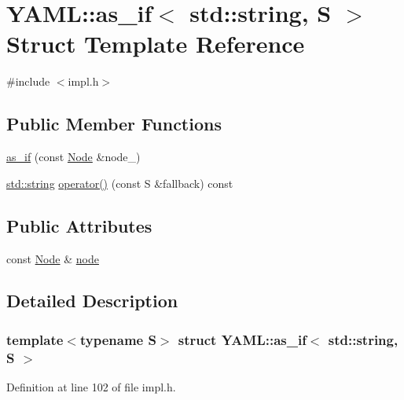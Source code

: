\hypertarget{struct_y_a_m_l_1_1as__if_3_01std_1_1string_00_01_s_01_4}{}\section{Y\+A\+ML\+::as\+\_\+if$<$ std\+::string, S $>$ Struct Template Reference}
\label{struct_y_a_m_l_1_1as__if_3_01std_1_1string_00_01_s_01_4}


{\ttfamily \#include $<$impl.\+h$>$}

\subsection*{Public Member Functions}
\begin{DoxyCompactItemize}
\item 
\mbox{\hyperlink{struct_y_a_m_l_1_1as__if_3_01std_1_1string_00_01_s_01_4_adb716ee9514394699a2fccac9723c390}{as\+\_\+if}} (const \mbox{\hyperlink{class_y_a_m_l_1_1_node}{Node}} \&node\+\_\+)
\item 
\mbox{\hyperlink{glad_8h_ac83513893df92266f79a515488701770}{std\+::string}} \mbox{\hyperlink{struct_y_a_m_l_1_1as__if_3_01std_1_1string_00_01_s_01_4_a19fdfc39f80777cf214c2530b3e5d260}{operator()}} (const S \&fallback) const
\end{DoxyCompactItemize}
\subsection*{Public Attributes}
\begin{DoxyCompactItemize}
\item 
const \mbox{\hyperlink{class_y_a_m_l_1_1_node}{Node}} \& \mbox{\hyperlink{struct_y_a_m_l_1_1as__if_3_01std_1_1string_00_01_s_01_4_ae4be7b0dcee5188473b42e7e14123d38}{node}}
\end{DoxyCompactItemize}


\subsection{Detailed Description}
\subsubsection*{template$<$typename S$>$\newline
struct Y\+A\+M\+L\+::as\+\_\+if$<$ std\+::string, S $>$}



Definition at line 102 of file impl.\+h.




